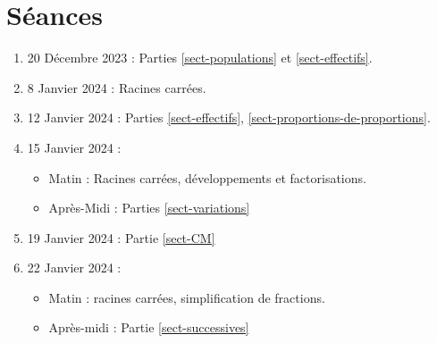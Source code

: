 \documentclass{article}
\begin{document}
\section*{Séances}
\begin{enumerate}
\item 20 Décembre 2023 : Parties \ref{sect-populations} et \ref{sect-effectifs}.
\item 8 Janvier 2024 : Racines carrées.
\item 12 Janvier 2024 : Parties \ref{sect-effectifs}, \ref{sect-proportions-de-proportions}.
\item 15 Janvier 2024 : 
    \begin{itemize}
    \item Matin : Racines carrées, développements et factorisations.
    \item Après-Midi : Parties \ref{sect-variations}  
    \end{itemize}
\item 19 Janvier 2024 : Partie \ref{sect-CM}
\item 22 Janvier 2024 :
    \begin{itemize}
    \item Matin : racines carrées, simplification de fractions.
    \item Après-midi : Partie \ref{sect-successives}  
    \end{itemize}
\end{enumerate}
\end{document}
